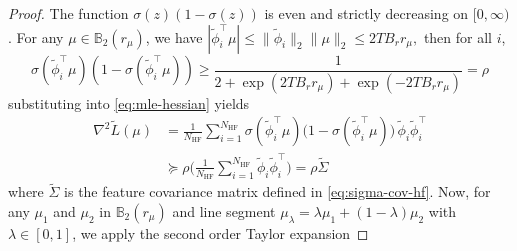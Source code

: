 \documentclass[10pt]{article} %
\theoremstyle{plain}
\theoremstyle{definition}
\theoremstyle{remark}
\newcommand{\bB}{\mathbb{B}}
\begin{document}
\begin{proof}
The function $\sigma(z)(1-\sigma(z))$
is even and strictly decreasing on $[0,\infty)$. For any $\mu\in\bB_2(r_\mu)$, we have \(
|\tilde\phi_i^\top\mu| \le \|\tilde\phi_i\|_2\|\mu\|_2 \le 2T B_r r_\mu,
\) then for all $i$, 
$$\sigma(\tilde\phi^\top_i\mu)(1-\sigma(\tilde\phi^\top_i\mu))\ge\frac{1}{2+\exp(2T B_rr_\mu)+\exp(-2T B_rr_\mu)}=\rho $$
 substituting into \ref{eq:mle-hessian} yields
\begin{align}
\nabla^2 \tilde L(\mu) &=\frac{1}{N_{\mathrm{HF}}}\sum_{i=1}^{N_{\mathrm{HF}}}\sigma(\tilde\phi_i^\top\mu)\bigl(1-\sigma(\tilde\phi_i^\top\mu)\bigr)\,
\tilde\phi_i\tilde\phi_i^\top\\
&\succeq\rho\bigl( \frac{1}{N_{\mathrm{HF}}}\sum_{i=1}^{N_{\mathrm{HF}}}\tilde\phi_i\tilde\phi_i^\top\bigr)
=\rho\tilde\Sigma
\end{align} 
where $\tilde\Sigma$ is the feature covariance matrix defined in \ref{eq:sigma-cov-hf}. Now, for any $\mu_1$ and $\mu_2$ in $\bB_2(r_\mu)$ and line segment $\mu_\lambda=\lambda\mu_1+(1-\lambda)\mu_2$ with $\lambda\in[0,1]$, we apply the second order Taylor expansion


\end{proof}
\end{document}
